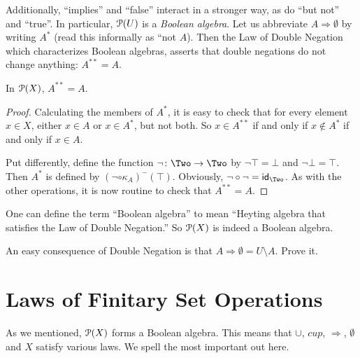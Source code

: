 Additionally, ``implies'' and ``false'' interact in a stronger way, as do ``but not'' and ``true''. 
In particular, ${\mathcal{P}}(U)$ is a \emph{Boolean algebra}. 
Let us abbreviate $A\Rightarrow\emptyset$ by writing $A^*$ (read this informally as ``not $A$).
Then the Law of Double Negation which characterizes Boolean algebras, asserts that double negations do not change anything: $A^{**} = A$.

\begin{lemma}
	In ${\mathcal{P}}(X)$, $A^{**} = A$.
	
	\begin{proof}
		Calculating the members of $A^*$, it is easy to check that for every element $x\in X$, either $x\in A$ or $x\in A^*$, but not both. 
		So $x\in A^{**}$ if and only if $x\notin A^*$ if and only if $x\in A$. 
		
		Put differently, define the function $\fromto {\mathord\neg}\Two\Two$ by $\neg\top=\bot$ and $\neg\bot = \top$.
		Then $A^*$ is defined by $(\neg\circ\kappa_A)^-(\top)$.
		Obviously, $\neg\circ \neg = \id_\Two$.
		As with the other operations, it is now routine to check that $A^{**}=A$.
	\end{proof}
\end{lemma}


One can define the term ``Boolean algebra'' to mean ``Heyting algebra that satisfies the Law of Double Negation.''
So ${\mathcal{P}}(X)$ is indeed a Boolean algebra. 

\begin{exercises}
	\begin{nextexercise}
		\item An easy consequence of Double Negation is that $A\Rightarrow \emptyset = U\setminus A$. Prove it.
	\end{nextexercise}
\end{exercises}

\printbreak
\section{Laws of Finitary Set Operations}

As we mentioned, ${\mathcal{P}}(X)$ forms a Boolean algebra. 
This means that $\cup$, $cup$, $\Rightarrow$, $\emptyset$ and $X$ satisfy various laws. 
We spell the most important out here.

